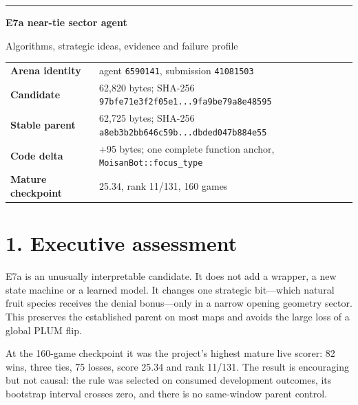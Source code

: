 \documentclass[10pt,a4paper]{article}
\begin{document}
{\color{accent}\rule{\textwidth}{1.4pt}}

{\Huge\bfseries\color{ink} E7a near-tie sector agent}

{\large\color{muted} Algorithms, strategic ideas, evidence and failure profile}

\vspace{2mm}
\begin{tabularx}{\textwidth}{@{}lY@{}}
\textbf{Arena identity} & agent \texttt{6590141}, submission \texttt{41081503} \\
\textbf{Candidate} & 62,820 bytes; SHA-256 \texttt{97bfe71e3f2f05e1...9fa9be79a8e48595} \\
\textbf{Stable parent} & 62,725 bytes; SHA-256 \texttt{a8eb3b2bb646c59b...dbded047b884e55} \\
\textbf{Code delta} & +95 bytes; one complete function anchor, \texttt{MoisanBot::focus\_type} \\
\textbf{Mature checkpoint} & 25.34, rank 11/131, 160 games \\
\end{tabularx}

\vspace{2mm}

\section*{1. Executive assessment}

E7a is an unusually interpretable candidate. It does not add a wrapper, a new state machine
or a learned model. It changes one strategic bit---which natural fruit species receives the
denial bonus---only in a narrow opening geometry sector. This preserves the established
parent on most maps and avoids the large loss of a global PLUM flip.

At the 160-game checkpoint it was the project's highest mature live scorer: 82 wins, three
ties, 75 losses, score 25.34 and rank 11/131. The result is encouraging but not causal: the
rule was selected on consumed development outcomes, its bootstrap interval crosses zero,
and there is no same-window parent control.
\end{document}
